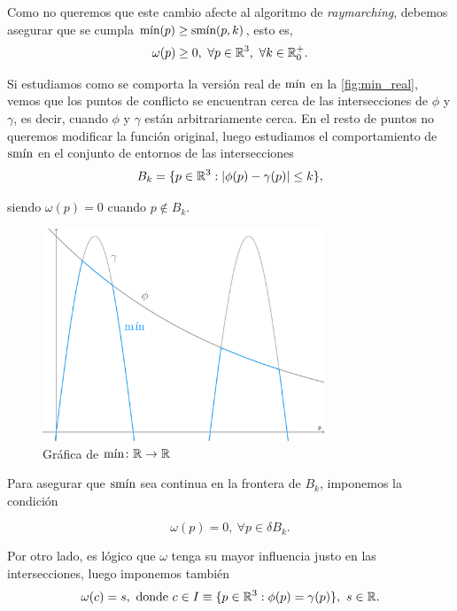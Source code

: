 Como no queremos que este cambio afecte al algoritmo de \textit{raymarching}, debemos asegurar que se cumpla $\Min(p)\ge \smin(p,k)$, esto es,
\begin{equation*}
\omega(p)\ge 0,\ \forall p\in \R^3,\ \forall k\in \R^+_0.
\end{equation*}

Si estudiamos como se comporta la versión real de $\Min$ en la \autoref{fig:min_real}, vemos que los puntos de conflicto se encuentran cerca de las intersecciones de $\phi$ y $\gamma$, es decir, cuando $\phi$ y $\gamma$ están arbitrariamente cerca. En el resto de puntos no queremos modificar la función original, luego estudiamos el comportamiento de $\smin$ en el conjunto de entornos de las intersecciones
\begin{equation*}
    B_{k} = \{p\in\R^3 : |\phi(p)-\gamma(p)| \le k\},
\end{equation*}

siendo $\omega(p) = 0$ cuando $p\notin B_{k}$.\newline

\begin{figure}[t]
    \centering
    \includegraphics[width=0.75\textwidth]{Plantilla-TFG-master/img/smooth_real.png}
    \caption{Gráfica de $\Min\colon \R\to\R$}
    \label{fig:min_real}
\end{figure}

Para asegurar que $\smin$ sea continua en la frontera de $B_{k}$, imponemos la condición 

\begin{equation*}
    \omega(p) = 0,\ \forall p \in \delta B_{k}.
\end{equation*}

Por otro lado, es lógico que $\omega$ tenga su mayor influencia justo en las intersecciones, luego imponemos también 
\begin{equation*}
    \omega(c) = s, \text{ donde } c \in I \equiv \{p\in\R^3 : \phi(p) = \gamma(p)\},\ s\in \R.
\end{equation*}

